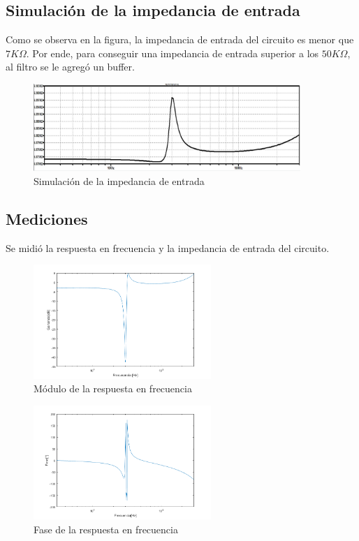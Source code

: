 \documentclass[../../tc_tp5_main.tex]{subfiles}
\begin{document}
\subsection{Simulación de la impedancia de entrada}
Como se observa en la figura, la impedancia de entrada del circuito es menor que $7K\Omega$. Por ende, para conseguir una impedancia de entrada superior a los $50K\Omega$, al filtro se le agreg\'o un buffer.

\begin{figure}[H]	
	\centering
	\includegraphics[width=0.9\textwidth]{imagenes/zinsim.png}
	\caption{Simulación de la impedancia de entrada}
\end{figure}


\subsection{Mediciones}

Se midió la respuesta en frecuencia y la impedancia de entrada del circuito.

\begin{figure}[H]	
	\centering
	\includegraphics[width=0.6\textwidth]{imagenes/mag.png}
	\caption{M\'odulo de la respuesta en frecuencia}
\end{figure}

\begin{figure}[H]	
	\centering
	\includegraphics[width=0.6\textwidth]{imagenes/fase.png}
	\caption{Fase de la respuesta en frecuencia}
\end{figure}
\end{document}
